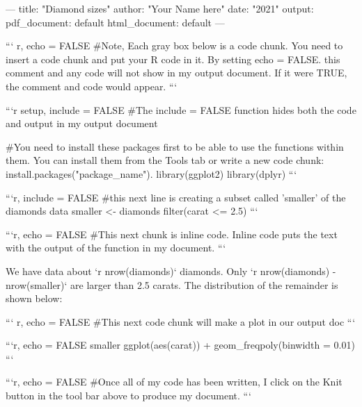 ---
title: "Diamond sizes"
author: "Your Name here"
date: "2021"
output:
  pdf_document: default
  html_document: default
---

``` {r, echo = FALSE}
#Note, Each gray box below is a code chunk. You need to insert a code chunk and put your R code in it. By setting echo = FALSE. this comment and any code will not show in my output document. If it were TRUE, the comment and code would appear. 
```

```{r setup, include = FALSE}
#The include = FALSE function hides both the code and output in my output document

#You need to install these packages first to be able to use the functions within them. You can install them from the Tools tab or write a new code chunk: install.packages("package_name"). 
library(ggplot2)
library(dplyr)
```

```{r, include = FALSE}
#this next line is creating a subset called 'smaller' of the diamonds data
smaller <- diamonds %
  filter(carat <= 2.5)
```

```{r, echo = FALSE}
#This next chunk is inline code. Inline code puts the text with the output of the function in my document.
```

We have data about `r nrow(diamonds)` diamonds. Only 
`r nrow(diamonds) - nrow(smaller)` are larger than
2.5 carats. The distribution of the remainder is shown
below:

``` {r, echo = FALSE}
#This next code chunk will make a plot in our output doc
```

```{r, echo = FALSE}
smaller %
  ggplot(aes(carat)) + 
  geom_freqpoly(binwidth = 0.01)
```

```{r, echo = FALSE}
#Once all of my code has been written, I click on the Knit button in the tool bar above to produce my document.
```
